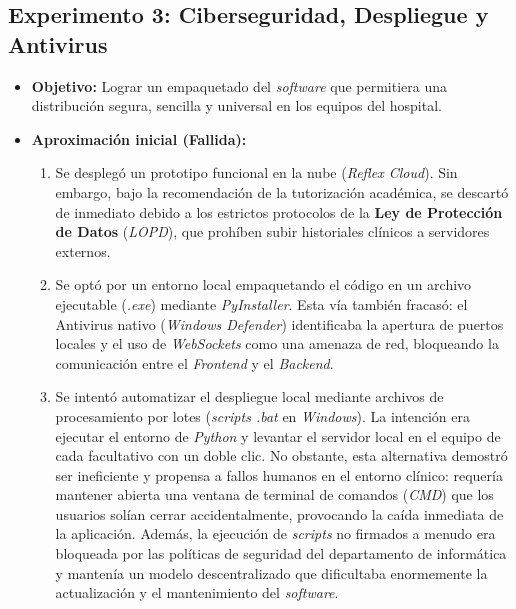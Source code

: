 \subsection{Experimento 3: Ciberseguridad, Despliegue y Antivirus}
\begin{itemize}
    \item \textbf{Objetivo:} Lograr un empaquetado del \textit{software} que permitiera una distribución segura, sencilla y universal en los equipos del hospital.
    \item \textbf{Aproximación inicial (Fallida):} 
    \begin{enumerate}
        \item Se desplegó un prototipo funcional en la nube (\textit{Reflex Cloud}). Sin embargo, bajo la recomendación de la tutorización académica, se descartó de inmediato debido a los estrictos protocolos de la \textbf{Ley de Protección de Datos} (\textit{LOPD}), que prohíben subir historiales clínicos a servidores externos.
        \item Se optó por un entorno local empaquetando el código en un archivo ejecutable (\textit{.exe}) mediante \textit{PyInstaller}. Esta vía también fracasó: el Antivirus nativo (\textit{Windows Defender}) identificaba la apertura de puertos locales y el uso de \textit{WebSockets} como una amenaza de red, bloqueando la comunicación entre el \textit{Frontend} y el \textit{Backend}.
        \item Se intentó automatizar el despliegue local mediante archivos de procesamiento por lotes (\textit{scripts .bat} en \textit{Windows}). La intención era ejecutar el entorno de \textit{Python} y levantar el servidor local en el equipo de cada facultativo con un doble clic. No obstante, esta alternativa demostró ser ineficiente y propensa a fallos humanos en el entorno clínico: requería mantener abierta una ventana de terminal de comandos (\textit{CMD}) que los usuarios solían cerrar accidentalmente, provocando la caída inmediata de la aplicación. Además, la ejecución de \textit{scripts} no firmados a menudo era bloqueada por las políticas de seguridad del departamento de informática y mantenía un modelo descentralizado que dificultaba enormemente la actualización y el mantenimiento del \textit{software}.
    \end{enumerate}

\end{itemize}
